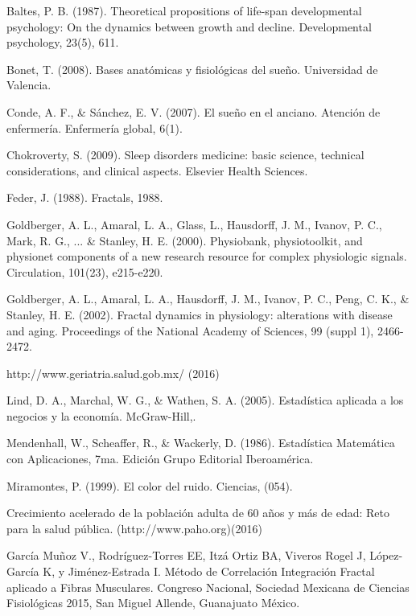 \documentclass[letterpaper,titlepage,12pt,draft]{report}
\begin{document}
\begin{thebibliography}{10}

{}

Baltes, P. B. (1987). Theoretical propositions of life-span developmental psychology: On the dynamics between growth and decline. Developmental psychology, 23(5), 611.

Bonet, T. (2008). Bases anat\'omicas y fisiol\'ogicas del sue\~no. Universidad de Valencia.

Conde, A. F., \& S\'anchez, E. V. (2007). El sue\~no en el anciano. Atenci\'on de enfermer\'ia. Enfermer\'ia global, 6(1).

Chokroverty, S. (2009). Sleep disorders medicine: basic science, technical considerations, and clinical aspects. Elsevier Health Sciences.

Feder, J. (1988). Fractals, 1988.

Goldberger, A. L., Amaral, L. A., Glass, L., Hausdorff, J. M., Ivanov, P. C., Mark, R. G., ... \& Stanley, H. E. (2000). Physiobank, physiotoolkit, and physionet components of a new research resource for complex physiologic signals. Circulation, 101(23), e215-e220.

Goldberger, A. L., Amaral, L. A., Hausdorff, J. M., Ivanov, P. C., Peng, C. K., \& Stanley, H. E. (2002). Fractal dynamics in physiology: alterations with disease and aging. Proceedings of the National Academy of Sciences, 99 (suppl 1), 2466-2472.

http://www.geriatria.salud.gob.mx/  (2016)

Lind, D. A., Marchal, W. G., \& Wathen, S. A. (2005). Estad\'istica aplicada a los negocios y la econom\'ia. McGraw-Hill,.

Mendenhall, W., Scheaffer, R., \& Wackerly, D. (1986). Estad\'istica Matem\'atica con Aplicaciones, 7ma. Edici\'on Grupo Editorial Iberoam\'erica.

Miramontes, P. (1999). El color del ruido. Ciencias, (054).

Crecimiento acelerado de la poblaci\'on adulta de 60 a\~nos y m\'as de edad: Reto para la salud p\'ublica. (http://www.paho.org)(2016)

Garc\'ia Mu\~noz V., Rodr\'iguez-Torres EE, Itz\'a Ortiz BA, Viveros Rogel J, L\'opez-Garc\'ia K, y Jim\'enez-Estrada I. M\'etodo de Correlaci\'on Integraci\'on Fractal aplicado a Fibras Musculares. Congreso Nacional, Sociedad Mexicana de Ciencias Fisiol\'ogicas 2015, San Miguel Allende, Guanajuato M\'exico.


\end{thebibliography}
\end{document}
